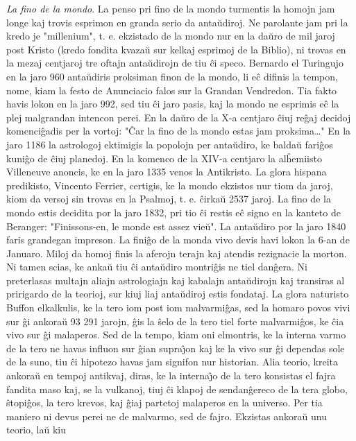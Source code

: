 \emph{La fino de la mondo}. La penso pri fino de la mondo turmentis
la homojn jam longe kaj trovis esprimon en granda serio da anta\u
udiroj. Ne parolante jam pri la kredo je "millenium", t. e.
ekzistado de la mondo nur en la da\u uro de mil jaroj post Kristo
(kredo fondita kvaza\u u sur kelkaj esprimoj de la Biblio), ni
trovas en la mezaj centjaroj tre oftajn anta\u udirojn de tiu \^ci
speco. Bernardo el Turingujo en la jaro 960 anta\u udiris proksiman
finon de la mondo, li e\^c difinis la tempon, nome, kiam la festo de
Anunciacio falos sur la Grandan Vendredon. Tia fakto havis lokon en
la jaro 992, sed tiu \^ci jaro pasis, kaj la mondo ne esprimis e\^c
la plej malgrandan intencon perei. En la da\u uro de la X-a centjaro
\^ciuj re\^gaj decidoj komenci\^gadis per la vortoj: "\^Car la fino
de la mondo estas jam proksima\dots" En la jaro 1186 la astrologoj
ektimigis la popolojn per anta\u udiro, ke balda\u u fari\^gos
kuni\^go de \^ciuj planedoj. En la komenco de la XIV-a centjaro la
al\^hemiisto Villeneuve anoncis, ke en la jaro 1335 venos la
Antikristo. La glora hispana predikisto, Vincento Ferrier, certigis,
ke la mondo ekzistos nur tiom da jaroj, kiom da versoj sin trovas en
la Psalmoj, t. e. \^cirka\u u 2537 jaroj. La fino de la mondo estis
decidita por la jaro 1832, pri tio \^ci restis e\^c signo en la
kanteto de Beranger: "Finissons-en, le monde est assez vie\u u".
La anta\u udiro por la jaro 1840 faris grandegan impreson. La
fini\^go de la monda vivo devis havi lokon la 6-an de Januaro. Miloj
da homoj finis la aferojn terajn kaj atendis rezignacie la morton.
Ni tamen scias, ke anka\u u tiu \^ci anta\u udiro montri\^gis ne
tiel dan\^gera. Ni preterlasas multajn aliajn astrologiajn kaj
kabalajn anta\u udirojn kaj transiras al pririgardo de la teorioj,
sur kiuj liaj anta\u udiroj estis fondataj. La glora naturisto
Buffon elkalkulis, ke la tero iom post iom malvarmi\^gas, sed la
homaro povos vivi sur \^gi ankora\u u 93 291 jarojn, \^gis la \^selo
de la tero tiel forte malvarmi\^gos, ke \^cia vivo sur \^gi
malaperos. Sed de la tempo, kiam oni elmontris, ke la interna varmo
de la tero ne havas influon sur \^gian supra\^{\j}on kaj ke la vivo
sur \^gi dependas sole de la suno, tiu \^ci hipotezo havas jam
signifon nur historian. Alia teorio, kreita ankora\u u en tempoj
antikvaj, diras, ke la interna\^{\j}o de la tero konsistas el fajra
fandita maso kaj, se la vulkanoj, tiuj \^ci klapoj de sendan\^gereco
de la tera globo, \^stopi\^gos, la tero krevos, kaj \^giaj partetoj
malaperos en la universo. Per tia maniero ni devus perei ne de
malvarmo, sed de fajro. Ekzistas ankora\u u unu teorio, la\u u kiu
